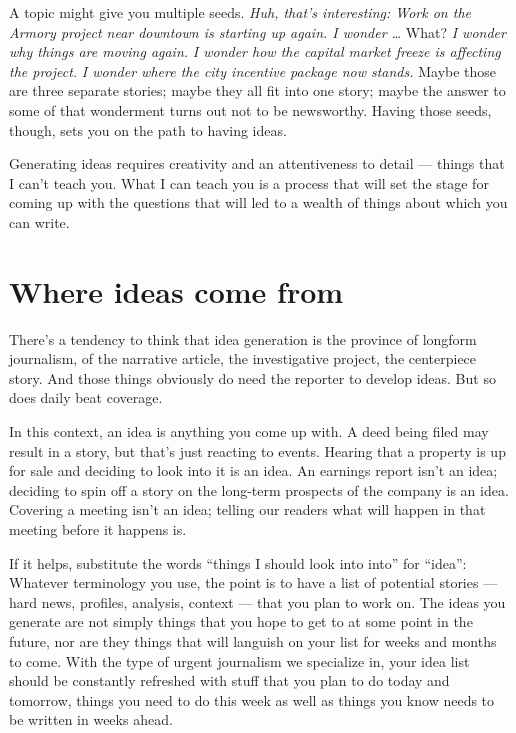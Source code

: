 \documentclass[
  12pt,
  american,
  letterpaperpaper,
  extrafontsizes,onecolumn,openright
  ]{memoir}
\begin{document}
A topic might give you multiple seeds. \emph{Huh, that's interesting: Work on the Armory project near downtown is starting up again. I wonder \ldots{}} What? \emph{I wonder why things are moving again.} \emph{I wonder how the capital market freeze is affecting the project.} \emph{I wonder where the city incentive package now stands.} Maybe those are three separate stories; maybe they all fit into one story; maybe the answer to some of that wonderment turns out not to be newsworthy. Having those seeds, though, sets you on the path to having ideas.

Generating ideas requires creativity and an attentiveness to detail --- things that I can't teach you. What I can teach you is a process that will set the stage for coming up with the questions that will led to a wealth of things about which you can write.

\hypertarget{where-ideas-come-from}{%
\section*{Where ideas come from}\label{where-ideas-come-from}}

There's a tendency to think that idea generation is the province of longform journalism, of the narrative article, the investigative project, the centerpiece story. And those things obviously do need the reporter to develop ideas. But so does daily beat coverage.

In this context, an idea is anything you come up with. A deed being filed may result in a story, but that's just reacting to events. Hearing that a property is up for sale and deciding to look into it is an idea. An earnings report isn't an idea; deciding to spin off a story on the long-term prospects of the company is an idea. Covering a meeting isn't an idea; telling our readers what will happen in that meeting before it happens is.

If it helps, substitute the words \enquote{things I should look into into} for \enquote{idea}: Whatever terminology you use, the point is to have a list of potential stories --- hard news, profiles, analysis, context --- that you plan to work on.
The ideas you generate are not simply things that you hope to get to at some point in the future, nor are they things that will languish on your list for weeks and months to come. With the type of urgent journalism we specialize in, your idea list should be constantly refreshed with stuff that you plan to do today and tomorrow, things you need to do this week as well as things you know needs to be written in weeks ahead.
\end{document}
